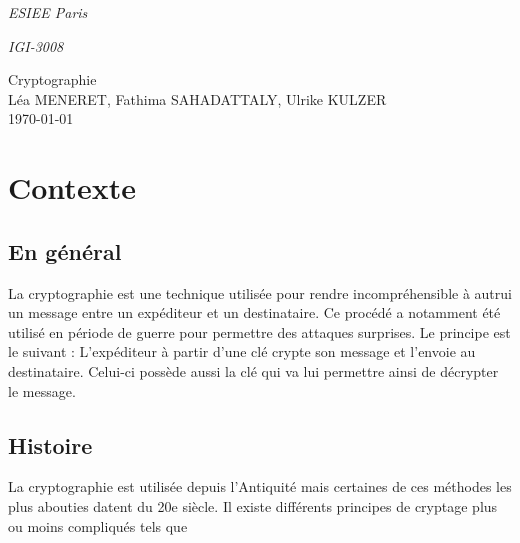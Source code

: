 \documentclass[a4paper,12pt,abstracton,titlepage]{scrartcl}
\begin{document}

{\Large\noindent \emph{ESIEE Paris}}

{\Large\noindent \emph{IGI-3008}}
\begin{center}
	{\large Cryptographie	 \\ \large Léa MENERET, Fathima SAHADATTALY, Ulrike KULZER \\ \today}
\end{center}

\setcounter{page}{1} %

\section{Contexte}
\subsection{En général}
La cryptographie est une technique utilisée pour rendre incompréhensible à autrui un message entre un expéditeur et un destinataire. Ce procédé a notamment été utilisé en période de guerre pour permettre des attaques surprises. 
Le principe est le suivant : L'expéditeur à partir d'une clé crypte son message et l'envoie au destinataire. Celui-ci possède aussi la clé qui va lui permettre ainsi de décrypter le message.

\subsection{Histoire}
La cryptographie est utilisée depuis l'Antiquité mais certaines de ces méthodes les plus abouties datent du 20e siècle. Il existe différents principes de cryptage plus ou moins compliqués tels que
\end{document}
